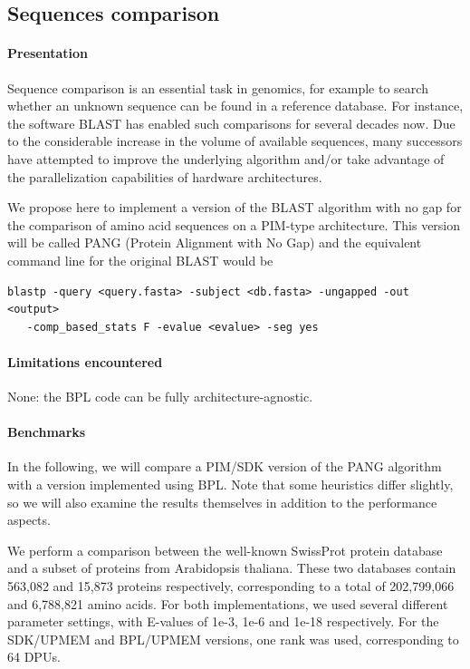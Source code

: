 \subsection{Sequences comparison}
\label{sec:pang}

\paragraph{Presentation}

Sequence comparison is an essential task in genomics, for example to search whether an unknown sequence can be found in a reference database. For instance, the software BLAST has enabled such comparisons for several decades now. Due to the considerable increase in the volume of available sequences, many successors have attempted to improve the underlying algorithm and/or take advantage of the parallelization capabilities of hardware architectures. 

We propose here to implement a version of the BLAST algorithm with no gap for the comparison of amino acid sequences on a PIM-type architecture. This version will be called PANG (Protein Alignment with No Gap) and the equivalent command line for the original BLAST would be

\begin{verbatim}
blastp -query <query.fasta> -subject <db.fasta> -ungapped -out <output> 
   -comp_based_stats F -evalue <evalue> -seg yes 
\end{verbatim}


\paragraph{Limitations encountered}
None: the BPL code can be fully architecture-agnostic.


\paragraph{Benchmarks} 

In the following, we will compare a PIM/SDK version of the PANG algorithm with a version implemented using BPL. Note that some heuristics differ slightly, so we will also examine the results themselves in addition to the performance aspects. 

We perform a comparison between the well-known SwissProt protein database and a subset of proteins from Arabidopsis thaliana. These two databases contain 563,082 and 15,873 proteins respectively, corresponding to a total of 202,799,066 and 6,788,821 amino acids. 
For both implementations, we used several different parameter settings, with E-values of 1e-3, 1e-6 and 1e-18 respectively.
For the SDK/UPMEM and BPL/UPMEM versions, one rank was used, corresponding to 64 DPUs.

